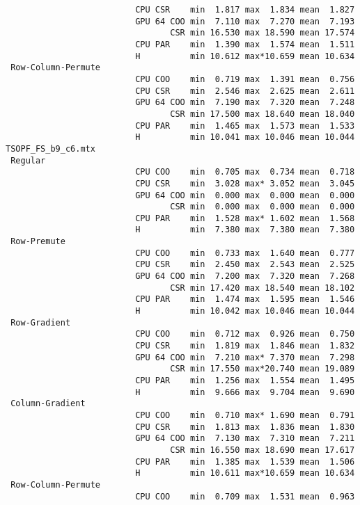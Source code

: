 \begin{verbatim}
                          CPU CSR    min  1.817 max  1.834 mean  1.827
                          GPU 64 COO min  7.110 max  7.270 mean  7.193
                                 CSR min 16.530 max 18.590 mean 17.574
                          CPU PAR    min  1.390 max  1.574 mean  1.511
                          H          min 10.612 max*10.659 mean 10.634
 Row-Column-Permute
                          CPU COO    min  0.719 max  1.391 mean  0.756
                          CPU CSR    min  2.546 max  2.625 mean  2.611
                          GPU 64 COO min  7.190 max  7.320 mean  7.248
                                 CSR min 17.500 max 18.640 mean 18.040
                          CPU PAR    min  1.465 max  1.573 mean  1.533
                          H          min 10.041 max 10.046 mean 10.044
TSOPF_FS_b9_c6.mtx
 Regular
                          CPU COO    min  0.705 max  0.734 mean  0.718
                          CPU CSR    min  3.028 max* 3.052 mean  3.045
                          GPU 64 COO min  0.000 max  0.000 mean  0.000
                                 CSR min  0.000 max  0.000 mean  0.000
                          CPU PAR    min  1.528 max* 1.602 mean  1.568
                          H          min  7.380 max  7.380 mean  7.380
 Row-Premute
                          CPU COO    min  0.733 max  1.640 mean  0.777
                          CPU CSR    min  2.450 max  2.543 mean  2.525
                          GPU 64 COO min  7.200 max  7.320 mean  7.268
                                 CSR min 17.420 max 18.540 mean 18.102
                          CPU PAR    min  1.474 max  1.595 mean  1.546
                          H          min 10.042 max 10.046 mean 10.044
 Row-Gradient
                          CPU COO    min  0.712 max  0.926 mean  0.750
                          CPU CSR    min  1.819 max  1.846 mean  1.832
                          GPU 64 COO min  7.210 max* 7.370 mean  7.298
                                 CSR min 17.550 max*20.740 mean 19.089
                          CPU PAR    min  1.256 max  1.554 mean  1.495
                          H          min  9.666 max  9.704 mean  9.690
 Column-Gradient
                          CPU COO    min  0.710 max* 1.690 mean  0.791
                          CPU CSR    min  1.813 max  1.836 mean  1.830
                          GPU 64 COO min  7.130 max  7.310 mean  7.211
                                 CSR min 16.550 max 18.690 mean 17.617
                          CPU PAR    min  1.385 max  1.539 mean  1.506
                          H          min 10.611 max*10.659 mean 10.634
 Row-Column-Permute
                          CPU COO    min  0.709 max  1.531 mean  0.963

\end{verbatim}
